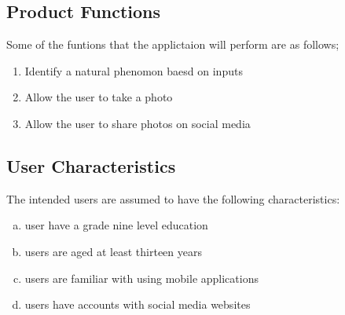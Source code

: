 \documentclass[]{article}
\begin{document}
\subsection{Product Functions}
\label{sub:product_functions}
Some of the funtions that the applictaion will perform are as follows;
\begin{enumerate}
\item Identify a natural phenomon baesd on inputs
\item Allow the user to take a photo
\item Allow the user to share photos on social media
\end{enumerate}

\subsection{User Characteristics}
\label{sub:user_characteristics}
The intended users are assumed to have the following characteristics:
\begin{enumerate}[a)]
	\item user have a grade nine level education
	\item users are aged at least thirteen years
	\item users are familiar with using mobile applications
	\item users have accounts with social media websites 
	  
\end{enumerate}
\end{document}
